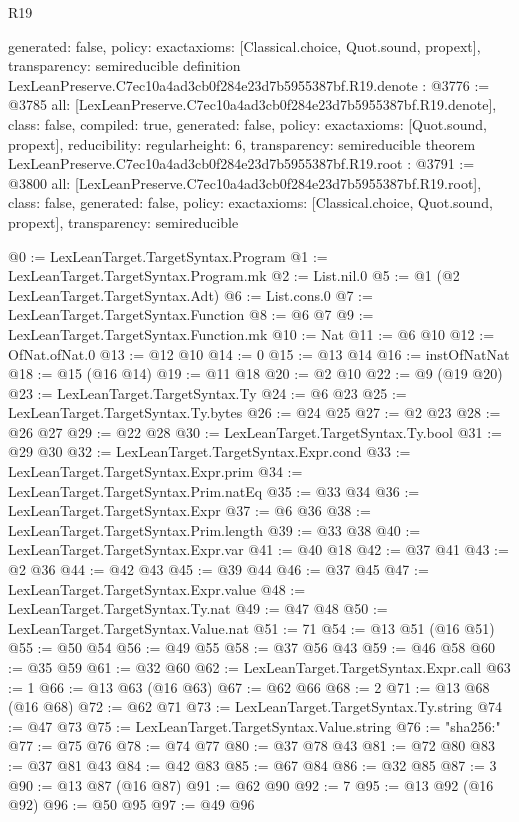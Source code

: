 \begin{lexlean}{R19}
\begin{coremodule}
{  generated: false,
  policy: exact{axioms: [Classical.choice, Quot.sound, propext]},
  transparency: semireducible
}
definition LexLeanPreserve.C7ec10a4ad3cb0f284e23d7b5955387bf.R19.denote : @3776 := @3785 {
  all: [LexLeanPreserve.C7ec10a4ad3cb0f284e23d7b5955387bf.R19.denote],
  class: false,
  compiled: true,
  generated: false,
  policy: exact{axioms: [Quot.sound, propext]},
  reducibility: regular{height: 6},
  transparency: semireducible
}
theorem LexLeanPreserve.C7ec10a4ad3cb0f284e23d7b5955387bf.R19.root : @3791 := @3800 {
  all: [LexLeanPreserve.C7ec10a4ad3cb0f284e23d7b5955387bf.R19.root],
  class: false,
  generated: false,
  policy: exact{axioms: [Classical.choice, Quot.sound, propext]},
  transparency: semireducible
}

@0 := LexLeanTarget.TargetSyntax.Program
@1 := LexLeanTarget.TargetSyntax.Program.mk
@2 := List.nil.{0}
@5 := @1 (@2 LexLeanTarget.TargetSyntax.Adt)
@6 := List.cons.{0}
@7 := LexLeanTarget.TargetSyntax.Function
@8 := @6 @7
@9 := LexLeanTarget.TargetSyntax.Function.mk
@10 := Nat
@11 := @6 @10
@12 := OfNat.ofNat.{0}
@13 := @12 @10
@14 := 0
@15 := @13 @14
@16 := instOfNatNat
@18 := @15 (@16 @14)
@19 := @11 @18
@20 := @2 @10
@22 := @9 (@19 @20)
@23 := LexLeanTarget.TargetSyntax.Ty
@24 := @6 @23
@25 := LexLeanTarget.TargetSyntax.Ty.bytes
@26 := @24 @25
@27 := @2 @23
@28 := @26 @27
@29 := @22 @28
@30 := LexLeanTarget.TargetSyntax.Ty.bool
@31 := @29 @30
@32 := LexLeanTarget.TargetSyntax.Expr.cond
@33 := LexLeanTarget.TargetSyntax.Expr.prim
@34 := LexLeanTarget.TargetSyntax.Prim.natEq
@35 := @33 @34
@36 := LexLeanTarget.TargetSyntax.Expr
@37 := @6 @36
@38 := LexLeanTarget.TargetSyntax.Prim.length
@39 := @33 @38
@40 := LexLeanTarget.TargetSyntax.Expr.var
@41 := @40 @18
@42 := @37 @41
@43 := @2 @36
@44 := @42 @43
@45 := @39 @44
@46 := @37 @45
@47 := LexLeanTarget.TargetSyntax.Expr.value
@48 := LexLeanTarget.TargetSyntax.Ty.nat
@49 := @47 @48
@50 := LexLeanTarget.TargetSyntax.Value.nat
@51 := 71
@54 := @13 @51 (@16 @51)
@55 := @50 @54
@56 := @49 @55
@58 := @37 @56 @43
@59 := @46 @58
@60 := @35 @59
@61 := @32 @60
@62 := LexLeanTarget.TargetSyntax.Expr.call
@63 := 1
@66 := @13 @63 (@16 @63)
@67 := @62 @66
@68 := 2
@71 := @13 @68 (@16 @68)
@72 := @62 @71
@73 := LexLeanTarget.TargetSyntax.Ty.string
@74 := @47 @73
@75 := LexLeanTarget.TargetSyntax.Value.string
@76 := "sha256:"
@77 := @75 @76
@78 := @74 @77
@80 := @37 @78 @43
@81 := @72 @80
@83 := @37 @81 @43
@84 := @42 @83
@85 := @67 @84
@86 := @32 @85
@87 := 3
@90 := @13 @87 (@16 @87)
@91 := @62 @90
@92 := 7
@95 := @13 @92 (@16 @92)
@96 := @50 @95
@97 := @49 @96

\end{coremodule}
\end{lexlean}
